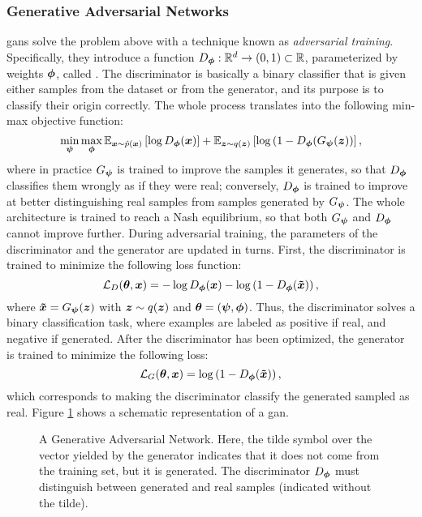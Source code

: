 \subsubsection*{Generative Adversarial Networks}
\glspl{gan} \citep{goodfellow2014gan} solve the problem above with a technique known as \emph{adversarial training}. Specifically, they introduce a function $D_{\boldsymbol{\phi}}: \mathbb{R}^d \rightarrow (0,1) \subset \mathbb{R}$, parameterized by weights $\boldsymbol{\phi}$, called . The discriminator is basically a binary classifier that is given either samples from the dataset or from the generator, and its purpose is to classify their origin correctly. The whole process translates into the following min-max objective function:
$$\min_{\GenParam} \max_{\DiscParam} \Expectation{\Vector{x} \sim \hat{p}(\Vector{x})}{\log \Discriminator(\Vector{x})} + \Expectation{\Vector{z} \sim q(\Vector{z})}{\log\Par{1-\Discriminator(\Generator(\Vector{z})}},$$
where in practice $G_{\boldsymbol{\psi}}$ is trained to improve the samples it generates, so that $D_{\boldsymbol{\phi}}$ classifies them wrongly as if they were real; conversely, $D_{\boldsymbol{\phi}}$ is trained to improve at better distinguishing real samples from samples generated by $G_{\boldsymbol{\psi}}$. The whole architecture is trained to reach a Nash equilibrium, so that both $G_{\boldsymbol{\psi}}$ and $D_{\boldsymbol{\phi}}$ cannot improve further. During adversarial training, the parameters of the discriminator and the generator are updated in turns. First, the discriminator is trained to minimize the following loss function:
$$\Loss_D(\Param, \Vector{x}) =  -\log \Discriminator(\Vector{x}) -\log\Par{1-\Discriminator(\Vector{\tilde{x}})},$$
where $\Vector{\tilde{x}} = \Generator(\Vector{z})$ with $\Vector{z} \sim q(\Vector{z})$ and $\boldsymbol{\theta} = (\boldsymbol{\psi}, \boldsymbol{\phi})$. Thus, the discriminator solves a binary classification task, where examples are labeled as positive if real, and negative if generated. After the discriminator has been optimized, the generator is trained to minimize the following loss:
$$\Loss_G(\Param, \Vector{x}) = \log\Par{1-\Discriminator(\Vector{\tilde{x}})},$$
which corresponds to making the discriminator classify the generated sampled as real. Figure \ref{fig:gan} shows a schematic representation of a \gls{gan}.
\begin{figure*}[h!]
    \centering
    \resizebox{.65\textwidth}{!}{}
    \caption{A Generative Adversarial Network. Here, the tilde symbol over the vector yielded by the generator indicates that it does not come from the training set, but it is generated. The discriminator $D_{\boldsymbol{\phi}}$ must distinguish between generated and real samples (indicated without the tilde).}
    \label{fig:gan}
\end{figure*}
